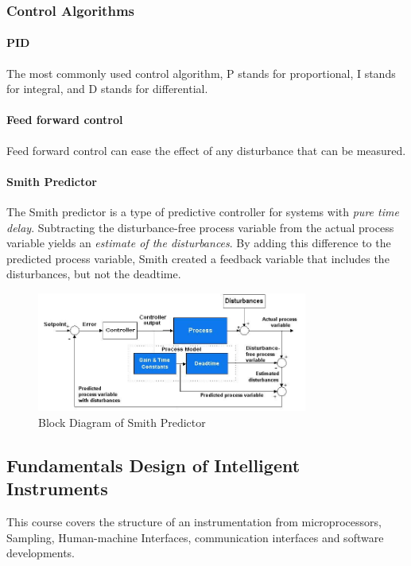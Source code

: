 \subsubsection{Control Algorithms}

\paragraph{PID} The most commonly used control algorithm, P stands for proportional, I stands for integral, and D stands for differential.

\paragraph{Feed forward control} Feed forward control can ease the effect of any disturbance that can be measured.

\paragraph{Smith Predictor} The Smith predictor is a type of predictive controller for systems with \emph{pure time delay}. Subtracting the disturbance-free process variable from the actual process variable yields an \emph{estimate of the disturbances}. By adding this difference to the predicted process variable, Smith created a feedback variable that includes the disturbances, but not the deadtime.

\begin{figure}
  \centering
  \includegraphics[width=3.5in]{fig/Smith_control2.jpg}
  \caption{Block Diagram of Smith Predictor}\label{fig_smith}
\end{figure}

\subsection{Fundamentals Design of Intelligent Instruments}
This course covers the structure of an instrumentation from microprocessors, Sampling, Human-machine Interfaces, communication interfaces and software developments.

